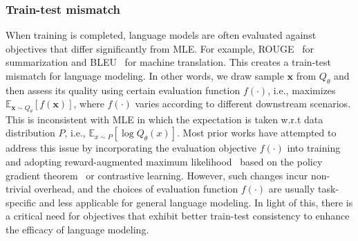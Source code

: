 \subsubsection{Train-test mismatch}
\label{sec:train_test_mismatch}
When training is completed, language models are often evaluated against objectives that differ significantly from MLE. For example, ROUGE~\citep{rouge} for summarization and BLEU~\citep{bleu} for machine translation. This creates a train-test mismatch for language modeling. In other words, we draw sample $\bm{x}$ from $Q_{\theta}$ and then assess its quality using certain evaluation function $f(\cdot)$, i.e., maximizes $\mathbb{E}_{\bm{x}\sim Q_{\theta}}[f(\bm{x})]$, where $f(\cdot)$ varies according to different downstream scenarios. This is inconsistent with MLE in which the expectation is taken w.r.t data distribution $P$, i.e., $\mathbb{E}_{x\sim P}[\log{Q_{\theta}(x)}]$. Most prior works have attempted to address this issue by incorporating the evaluation objective $f(\cdot)$ into training and adopting reward-augmented maximum likelihood~\cite{raml,zhang2018minimum,brio} based on the policy gradient theorem~\citep{pg} or contrastive learning. However, such changes incur non-trivial overhead, and the choices of evaluation function $f(\cdot)$ are usually task-specific and less applicable for general language modeling. In light of this, there is a critical need for objectives that exhibit better train-test consistency to enhance the efficacy of language modeling.

